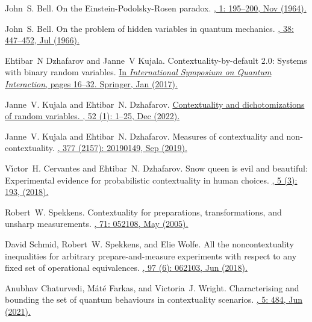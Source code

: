\documentclass[letterpaper,onecolumn,12pt,accepted=2024-01-17]{article}
\begin{document}
\begin{thebibliography}{100}
John~S. Bell.
\newblock On the {E}instein-{P}odolsky-{R}osen paradox.
\href{https://journals.aps.org/ppf/pdf/10.1103/PhysicsPhysiqueFizika.1.195}{, 1: 195--200, Nov (1964).}

John~S. Bell.
\newblock On the problem of hidden variables in quantum mechanics.
\href{https://doi.org/10.1103/RevModPhys.38.447}{, 38: 447--452, Jul (1966).}

Ehtibar~N Dzhafarov and Janne~V Kujala.
\newblock Contextuality-by-default 2.0: Systems with binary random variables.
\href{https://doi.org/10.1007/978-3-319-52289-0_2}{\newblock In {\em International Symposium on Quantum Interaction}, pages 16--32. Springer, Jan (2017).}

Janne~V. Kujala and Ehtibar~N. Dzhafarov.
\href{https://doi.org/10.1007/s10701-021-00527-9}{\newblock Contextuality and dichotomizations of random variables.
, 52 (1): 1--25, Dec (2022).}

Janne~V. Kujala and Ehtibar~N. Dzhafarov.
\newblock Measures of contextuality and non-contextuality.
\href{https://doi.org/10.1098/rsta.2019.0149}{,
  377 (2157): 20190149, Sep (2019).}

V{\'\i}ctor~H. Cervantes and Ehtibar~N. Dzhafarov.
\newblock Snow queen is evil and beautiful: {E}xperimental evidence for
  probabilistic contextuality in human choices.
\href{https://psycnet.apa.org/doi/10.1037/dec0000095}{, 5 (3): 193, (2018).}

Robert~W. Spekkens.
\newblock Contextuality for preparations, transformations, and unsharp measurements.
\href{https://doi.org/10.1103/PhysRevA.71.052108}{, 71: 052108, May (2005).}

David Schmid, Robert~W. Spekkens, and Elie Wolfe.
\newblock All the noncontextuality inequalities for arbitrary prepare-and-measure experiments with respect to any fixed set of operational equivalences.
\href{https://doi.org/10.1103/PhysRevA.97.062103}{, 97 (6): 062103, Jun (2018).}

Anubhav Chaturvedi, M{\'a}t{\'e} Farkas, and Victoria~J. Wright.
\newblock Characterising and bounding the set of quantum behaviours in contextuality scenarios.
\href{https://doi.org/10.22331/q-2021-06-29-484}{, 5: 484, Jun (2021).}


\end{thebibliography}
\end{document}

